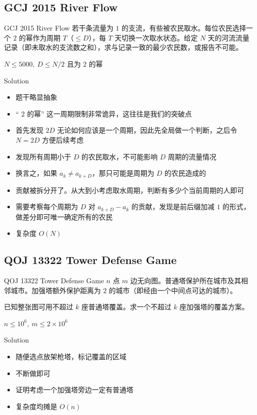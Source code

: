 ﻿\documentclass[aspectratio=169]{ctexbeamer}
\begin{document}
\subsection{GCJ 2015 River Flow}
\begin{frame}{GCJ 2015 River Flow}
    若干条流量为 $1$ 的支流，有些被农民取水。每位农民选择一个 $2$ 的幂作为周期 $T$（$\le D$），每 $T$ 天切换一次取水状态。给定 $N$ 天的河流流量记录（即未取水的支流数之和），求与记录一致的最少农民数，或报告不可能。
    
    $N\le 5000,\ D\le N/2$ 且为 $2$ 的幂
\end{frame}

\begin{frame}{Solution}
    \begin{itemize}
        \item 题干略显抽象
        \item “ $ 2 $ 的幂” 这一周期限制非常诡异，这往往是我们的突破点
        \item 首先发现 $2D$ 无论如何应该是一个周期，因此先全局做一个判断，之后令 $N=2D$ 方便后续考虑
        \item 发现所有周期小于 $D$ 的农民取水，不可能影响 $D$ 周期的流量情况
        \item 换言之，如果 $a_k\neq a_{k+D}$，那只可能是周期为 $D$ 的农民造成的
        \item 贡献被拆分开了。从大到小考虑取水周期，判断有多少个当前周期的人即可
        \item 需要考察每个周期为 $D$ 对 $a_{k+D}-a_k$ 的贡献，发现是前后缀加减 $ 1 $ 的形式，做差分即可唯一确定所有的农民
        \item 复杂度 $O(N)$
    \end{itemize}
\end{frame}



\subsection{QOJ 13322 Tower Defense Game}
\begin{frame}{QOJ 13322 Tower Defense Game}
    $n$ 点 $m$ 边无向图。普通塔保护所在城市及其相邻城市。加强塔额外保护距离为 $2$ 的城市（即经由一个中间点可达的城市）。
    
    已知整张图可用不超过 $k$ 座普通塔覆盖。求一个不超过 $k$ 座加强塔的覆盖方案。
    
    $n\le 10^6,\ m\le 2\times10^6$
\end{frame}

\begin{frame}{Solution}
    \begin{itemize}
        \item 随便选点放架枪塔，标记覆盖的区域
        \item 不断做即可
        \item 证明考虑一个加强塔旁边一定有普通塔
        \item 复杂度均摊是 $O(n)$
    \end{itemize}
\end{frame}
\end{document}
